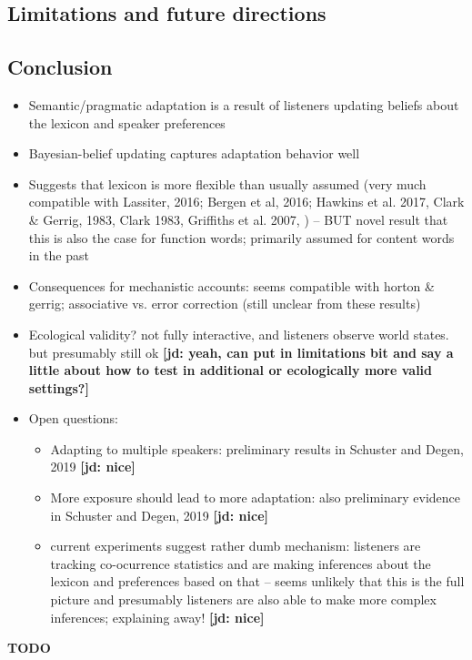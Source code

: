 \documentclass[lucida,biblatex]{sp} %
\newcommand{\jd}[1]{\textcolor{PinkyPurple}{\textbf{[jd: #1]}}}
\begin{document}
\subsection{Limitations and future directions}

\subsection{Conclusion}


\begin{itemize}
\item Semantic/pragmatic adaptation is a result of listeners updating beliefs about the lexicon and speaker preferences
\item Bayesian-belief updating captures adaptation behavior well
\item Suggests that lexicon is more flexible than usually assumed (very much compatible with Lassiter, 2016; Bergen et al, 2016; Hawkins et al. 2017, Clark \& Gerrig, 1983, Clark 1983, Griffiths et al. 2007, ) -- BUT novel result that this is also the case for function words; primarily assumed for content words in the past


\item Consequences for mechanistic accounts: seems compatible with horton \& gerrig; associative vs. error correction (still unclear from these results)
\item Ecological validity? not fully interactive, and listeners observe world states. but presumably still ok \jd{yeah, can put in limitations bit and say a little about how to test in additional or ecologically more valid settings?}
\item Open questions:
\begin{itemize}
\item Adapting to multiple speakers: preliminary results in Schuster and Degen, 2019 \jd{nice}
\item More exposure should lead to more adaptation: also preliminary evidence in Schuster and Degen, 2019 \jd{nice}
\item current experiments suggest rather dumb mechanism: listeners are tracking co-ocurrence statistics and 
are making inferences about the lexicon and preferences based on that -- seems unlikely that this is the full picture and
presumably listeners are also able to make more complex inferences; explaining away! \jd{nice}
\end{itemize}
\end{itemize}


{\bf TODO} 
\end{document}
